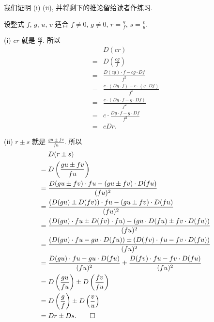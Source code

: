 \begin{pf}
    我们证明 (i) (ii), 并将剩下的推论留给读者作练习.

    设整式 $f$, $g$, $u$, $v$ 适合 $f \neq 0$, $g \neq 0$, $r = \frac{g}{f}$, $s = \frac{v}{u}$.

    (i) $cr$ 就是 $\frac{cg}{f}$. 所以
    \begin{align*}
             & D(cr)                                                   \\
        = {} & D \left( \frac{cg}{f} \right)                           \\
        = {} & \frac{D(cg) \cdot f - cg \cdot Df}{f^2}                 \\
        = {} & \frac{c \cdot (Dg \cdot f) - c \cdot (g \cdot Df)}{f^2} \\
        = {} & \frac{c \cdot (Dg \cdot f - g \cdot Df)}{f^2}           \\
        = {} & c \cdot \frac{Dg \cdot f - g \cdot Df}{f^2}             \\
        = {} & cDr.
    \end{align*}

    (ii) $r \pm s$ 就是 $\frac{gu \pm fv}{fu}$. 所以
    \begin{align*}
             & D(r \pm s)                                                                                        \\
        = {} & D \left( \frac{gu \pm fv}{fu} \right)                                                             \\
        = {} & \frac{D(gu \pm fv) \cdot fu - (gu \pm fv) \cdot D(fu)}{(fu)^2}                                    \\
        = {} & \frac{(D(gu) \pm D(fv)) \cdot fu - (gu \pm fv) \cdot D(fu)}{(fu)^2}                               \\
        = {} & \frac{(D(gu) \cdot fu \pm D(fv) \cdot fu) - (gu \cdot D(fu) \pm fv \cdot D(fu))}{(fu)^2}          \\
        = {} & \frac{(D(gu) \cdot fu - gu \cdot D(fu)) \pm (D(fv) \cdot fu - fv \cdot D(fu))}{(fu)^2}            \\
        = {} & \frac{D(gu) \cdot fu - gu \cdot D(fu)}{(fu)^2} \pm \frac{D(fv) \cdot fu - fv \cdot D(fu)}{(fu)^2} \\
        = {} & D \left( \frac{gu}{fu} \right) \pm D \left( \frac{fv}{fu} \right)                                 \\
        = {} & D \left( \frac{g}{f} \right) \pm D \left( \frac{v}{u} \right)                                     \\
        = {} & Dr \pm Ds. \qedhere
    \end{align*}
\end{pf}

